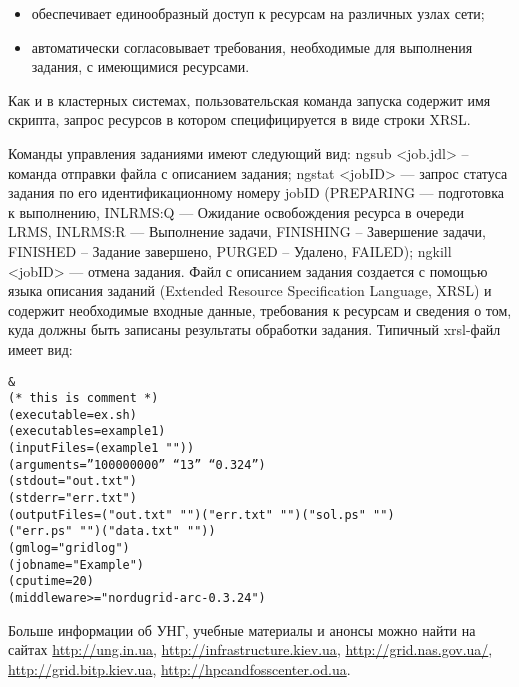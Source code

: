 \documentclass[10pt, a5paper]{article}
\begin{document}
\begin{itemize}
  \item обеспечивает единообразный доступ к ресурсам на различных узлах сети;
  \item автоматически согласовывает требования, необходимые для выполнения задания, с имеющимися ресурсами.
\end{itemize}

Как и в кластерных системах, пользовательская команда запуска содержит имя скрипта, запрос ресурсов в котором специфицируется в виде строки XRSL.

Команды управления заданиями имеют следующий вид: ngsub <job.jdl> -- команда отправки файла с описанием задания; ngstat <jobID> --- запрос статуса задания по его идентификационному номеру jobID (PREPARING --- подготовка к выполнению, INLRMS:Q --- Ожидание освобождения ресурса в очереди LRMS, INLRMS:R --- Выполнение задачи, FINISHING – Завершение задачи, FINISHED -- Задание завершено, PURGED -- Удалено, FAILED); ngkill <jobID> --- отмена задания.
Файл с описанием задания создается с помощью языка описания заданий (Extended Resource Specification Language, XRSL) и содержит необходимые входные данные, требования к ресурсам и сведения о том, куда должны быть записаны результаты обработки задания. Типичный xrsl-файл имеет вид:

\begin{verbatim}
&
(* this is comment *)
(executable=ex.sh)
(executables=example1)
(inputFiles=(example1 ""))
(arguments=”100000000” “13” “0.324”)
(stdout="out.txt")
(stderr="err.txt")
(outputFiles=("out.txt" "")("err.txt" "")("sol.ps" "")
("err.ps" "")("data.txt" ""))
(gmlog="gridlog")
(jobname="Example")
(cputime=20)
(middleware>="nordugrid-arc-0.3.24")
\end{verbatim}

Больше информации об УНГ, учебные материалы и анонсы можно найти на сайтах \url{http://ung.in.ua},  \url{http://infrastructure.kiev.ua}, \url{http://grid.nas.gov.ua/}, \url{http://grid.bitp.kiev.ua}, \linebreak \url{http://hpcandfosscenter.od.ua}.
\end{document}
